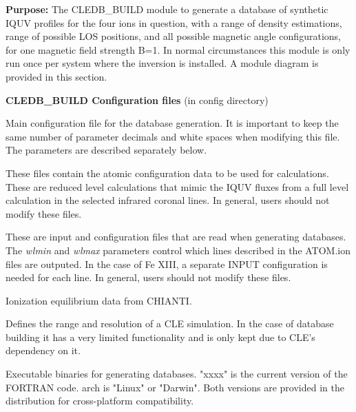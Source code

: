 \documentclass{article}
\begin{document}
\textbf{Purpose:} The CLEDB\_BUILD module to generate a database of synthetic IQUV profiles for the four ions in question, with a range of density estimations, range of possible LOS positions, and all possible magnetic angle configurations, for one magnetic field strength B=1.  In normal circumstances this module is only run once per system where the inversion is installed. A module diagram is provided in this section.

\textbf{CLEDB\_BUILD Configuration files} (in config directory)
\begin{description}
    [font=\normalfont,leftmargin=1.3in,style=multiline]
	\item[DB.INPUT]
	Main configuration file for the database generation. It is important to keep the same number of parameter decimals and white spaces when modifying this file. The parameters are described separately below. 
    \item[ATOM.ion]
    	These files contain the atomic configuration data to be used for calculations. These are reduced level calculations that mimic the IQUV fluxes from a full level calculation in the selected infrared coronal lines. In general, users should not modify these files.
	\item[INPUT.ion(a/b)]
	These are input and configuration files that are read when generating databases. The \emph{wlmin} and \emph{wlmax} parameters control which lines described in the ATOM.ion files are outputed. In the case of Fe XIII, a separate INPUT configuration is needed for each line. In general, users should not modify these files.   
	\item[IONEQ]
	Ionization equilibrium data from CHIANTI.
	\item[GRID.DAT]
	Defines the range and resolution of a CLE simulation. In the case of database building it has a very limited functionality and is only kept due to CLE's dependency on it.
	\item[db"xxxx"\_"arch"]
	Executable binaries for generating databases. "xxxx" is the current version of the FORTRAN code. arch is "Linux" or "Darwin". Both versions are provided in the distribution for cross-platform compatibility.	
\end{description}
    
\end{document}
